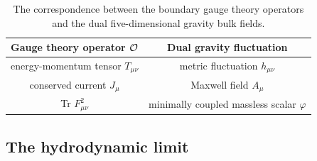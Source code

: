 \documentclass[]{iopart}
\begin{document}
\begin{table}
\caption{\label{tab:gauge-grav-id} The correspondence between the boundary
  gauge theory operators and the dual five-dimensional gravity bulk fields.}
\begin{tabular}{|c||c|}  \hline
%
Gauge theory operator ${\cal O}$ &  Dual gravity fluctuation \\
\hline
%
energy-momentum tensor $T_{\mu\nu}$ & metric fluctuation $h_{\mu\nu}$\\
conserved current $J_{\mu}$ & Maxwell field $A_{\mu}$\\
Tr $F_{\mu\nu}^2$ & minimally coupled massless scalar $\varphi$\\
%
\hline
%
\end{tabular}
\end{table}
%

\subsection{\label{sec:hydlim}The hydrodynamic limit}
\end{document}
